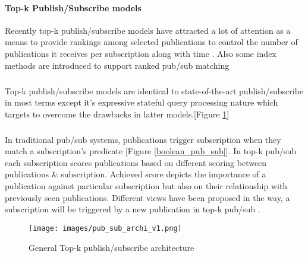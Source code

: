 \documentclass[a4paper,12pt,oneside]{book}
\theoremstyle{definition}
\theoremstyle{remark}
\begin{document}
\paragraph*{Top-k Publish/Subscribe models}
Recently top-k publish/\-subscribe models have attracted a lot of attention as a means to provide rankings among selected publications to control the number of publications it receives per subscription along with time \cite{Shraer2013,Pripuzic2012,Drosou2009,Drosou2009workshopp,Pripuzi2008}. Also some index methods are introduced to support ranked pub/sub matching \cite{Matching2012,Whang2009,Machanavajjhala2008}
\subparagraph*{}
Top-k publish/subscribe models are identical to state-of-the-art publish/subscribe in most terms except it's expressive stateful query processing nature which targets to overcome the drawbacks in latter models.[Figure \ref{pub_sub_architecture}]
\subparagraph*{} 
In traditional pub/sub systems, publications trigger subscription when they match a subscription's predicate [Figure \ref{boolean_pub_sub}]. In top-k pub/sub each subscription scores publications based on different scoring between publications \& subscription. Achieved score depicts the importance of a publication against particular subscription but also on their relationship with previously seen publications. Different views have been proposed in the way, a subscription will be triggered by a new publication in top-k pub/sub \cite{Shraer2013}.

\begin{figure}[h]
\begin{center}
\texttt{[image: images/pub\_sub\_archi\_v1.png]}
\caption{General Top-k publish/subscribe architecture}
\label{pub_sub_architecture}
\end{center}
\end{figure}
\end{document}
